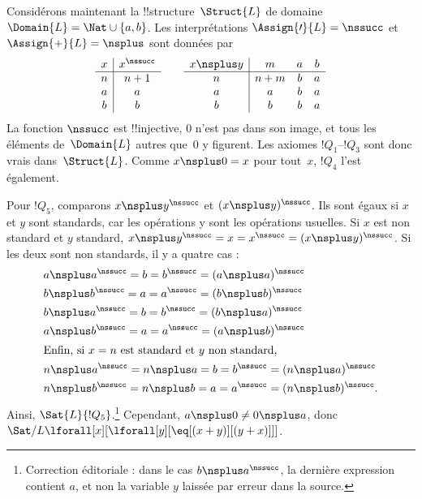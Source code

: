 \documentclass[../../../include/open-logic-section]{subfiles}
\begin{document}
\begin{ex}
Considérons maintenant la !!{structure}~$\Struct{L}$
de domaine $\Domain{L}=\Nat\cup\{a,b\}$.
Les interprétations
$\Assign{\prime}{L}=\nssucc$ et
$\Assign{+}{L}=\nsplus$ sont données par
\[
\begin{array}{c|c}
  x & x^\nssucc \\
  \hline
  n & n+1 \\
  a & a\\
  b & b
\end{array}
\qquad
\begin{array}{c|ccc}
  x\nsplus y & m & a & b\\
  \hline
  n & n+m & b & a\\
  a & a & b & a\\
  b & b & b & a
\end{array}
\]
La fonction $\nssucc$ est !!{injective},
$0$ n'est pas dans son image, et tous les
éléments de~$\Domain{L}$ autres que~$0$
y figurent. Les axiomes $!Q_1$--$!Q_3$
sont donc vrais dans~$\Struct{L}$.
Comme $x\nsplus 0=x$ pour tout~$x$,
$!Q_4$ l'est également.

Pour $!Q_5$, comparons
$x\nsplus y^\nssucc$ et
$(x\nsplus y)^\nssucc$.
Ils sont égaux si $x$ et $y$ sont
standards, car les opérations y sont
les opérations usuelles. Si $x$ est
non standard et $y$ standard,
$x\nsplus y^\nssucc=x=x^\nssucc
=(x\nsplus y)^\nssucc$.
Si les deux sont non standards,
il y a quatre cas :
\begin{align*}
& a\nsplus a^\nssucc
   =b=b^\nssucc=(a\nsplus a)^\nssucc\\
& b\nsplus b^\nssucc
   =a=a^\nssucc=(b\nsplus b)^\nssucc\\
& b\nsplus a^\nssucc
   =b=b^\nssucc=(b\nsplus a)^\nssucc\\
& a\nsplus b^\nssucc
   =a=a^\nssucc=(a\nsplus b)^\nssucc\\
\intertext{Enfin, si $x=n$ est standard et
  $y$ non standard,}
& n\nsplus a^\nssucc
   =n\nsplus a=b=b^\nssucc
   =(n\nsplus a)^\nssucc\\
& n\nsplus b^\nssucc
   =n\nsplus b=a=a^\nssucc
   =(n\nsplus b)^\nssucc.
\end{align*}
Ainsi, $\Sat{L}{!Q_5}$.\footnote{Correction éditoriale : dans le cas $b\nsplus a^\nssucc$, la dernière expression contient $a$, et non la variable $y$ laissée par erreur dans la source.} Cependant,
$a\nsplus 0\neq 0\nsplus a$, donc
$\Sat/{L}{\lforall[x][\lforall[y][
\eq[(x+y)][(y+x)]]]}$.
\end{ex}
\end{document}
